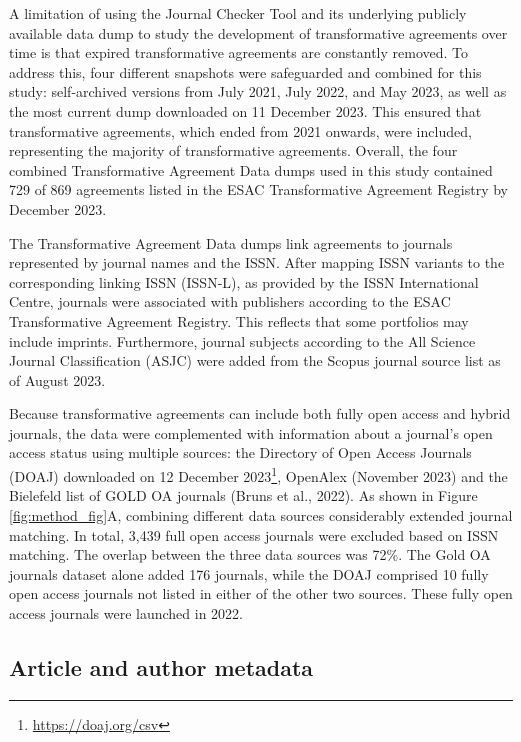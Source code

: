 \documentclass[a4paper,man,floatsintext,longtable,noextraspace,12pt]{apa6}
\begin{document}
A limitation of using the Journal Checker Tool and its underlying
publicly available data dump to study the development of transformative
agreements over time is that expired transformative agreements are
constantly removed. To address this, four different snapshots were
safeguarded and combined for this study: self-archived versions from
July 2021, July 2022, and May 2023, as well as the most current dump
downloaded on 11 December 2023. This ensured that transformative
agreements, which ended from 2021 onwards, were included, representing
the majority of transformative agreements. Overall, the four combined
Transformative Agreement Data dumps used in this study contained 729 of
869 agreements listed in the ESAC Transformative Agreement Registry by
December 2023.

The Transformative Agreement Data dumps link agreements to journals
represented by journal names and the ISSN. After mapping ISSN variants
to the corresponding linking ISSN (ISSN-L), as provided by the ISSN
International Centre, journals were associated with publishers according
to the ESAC Transformative Agreement Registry. This reflects that some
portfolios may include imprints. Furthermore, journal subjects according
to the All Science Journal Classification (ASJC) were added from the
Scopus journal source list as of August 2023.

Because transformative agreements can include both fully open access and
hybrid journals, the data were complemented with information about a
journal's open access status using multiple sources: the Directory of
Open Access Journals (DOAJ) downloaded on 12 December 2023\footnote{\url{https://doaj.org/csv}},
OpenAlex (November 2023) and the Bielefeld list of GOLD OA journals
(Bruns et al., 2022). As shown in Figure \ref{fig:method_fig}A,
combining different data sources considerably extended journal matching.
In total, 3,439 full open access journals were excluded based on ISSN
matching. The overlap between the three data sources was 72\%. The Gold
OA journals dataset alone added 176 journals, while the DOAJ comprised
10 fully open access journals not listed in either of the other two
sources. These fully open access journals were launched in 2022.

\hypertarget{article-and-author-metadata}{%
\subsection{Article and author
metadata}\label{article-and-author-metadata}}
\end{document}
